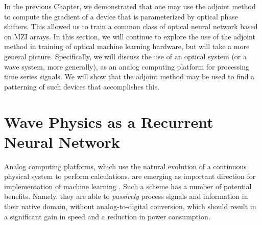 In the previous Chapter, we demonstrated that one may use the adjoint method to compute the gradient of a device that is parameterized by optical phase shifters.  This allowed us to train a common class of optical neural network based on MZI arrays.  In this section, we will continue to explore the use of the adjoint method in training of optical machine learning hardware, but will take a more general picture.  Specifically, we will discuss the use of an optical system (or a wave system, more generally), as an analog computing platform for processing time series signals.  We will show that the adjoint method may be used to find a patterning of such devices that accomplishes this.



\section{Wave Physics as a Recurrent Neural Network}

Analog computing platforms, which use the natural evolution of a continuous physical system to perform calculations, are emerging as important direction for implementation of machine learning \cite{shen_deep_2017, biamonte_quantum_2017, laporte2018numerical, lin2018all, khoram_stochastic_2018}.
Such a scheme has a number of potential benefits. Namely, they are able to \textit{passively} process signals and information in their native domain, without analog-to-digital conversion, which should result in a significant gain in speed and a reduction in power consumption.

